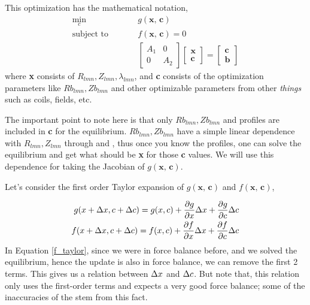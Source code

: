 This optimization has the mathematical notation,
\begin{equation}
    \begin{split}
        \min_{c} \hspace{1cm} &g(\textbf{x, c}) \\
        \text{subject to } \hspace{1cm} &f(\textbf{x, c}) = 0\\
        &\begin{bmatrix}
            A_1 & 0\\ 0 & A_2
        \end{bmatrix}\begin{bmatrix}
            \mathbf{x} \\ \mathbf{c}
        \end{bmatrix} = \begin{bmatrix}
            \mathbf{c} \\ \mathbf{b}
        \end{bmatrix}
    \end{split}
\end{equation}
where \textbf{x} consists of $R_{lmn}, Z_{lmn}, \lambda_{lmn}$, and \textbf{c} consists of the optimization parameters like $Rb_{lmn}, Zb_{lmn}$ and other optimizable parameters from other \textit{things} such as coils, fields, etc.

The important point to note here is that only $Rb_{lmn}, Zb_{lmn}$ and profiles are included in \textbf{c} for the equilibrium. $Rb_{lmn}, Zb_{lmn}$ have a simple linear dependence with $R_{lmn}, Z_{lmn}$ through  and , thus once you know the profiles, one can solve the equilibrium and get what should be \textbf{x} for those \textbf{c} values. We will use this dependence for taking the Jacobian of $g(\textbf{x, c})$.

Let's consider the first order Taylor expansion of $g(\textbf{x, c})$ and $f(\textbf{x, c})$,

\begin{align}
    g(x + \Delta x,c + \Delta c) = g(x, c) + \frac{\partial g}{\partial x} \Delta x + \frac{\partial g}{\partial c} \Delta c \label{g_taylor}\\
    f(x + \Delta x,c + \Delta c) = f(x, c) + \frac{\partial f}{\partial x} \Delta x + \frac{\partial f}{\partial c} \Delta c \label{f_taylor}
\end{align}
In Equation \ref{f_taylor}, since we were in force balance before, and we solved the equilibrium, hence the update is also in force balance, we can remove the first 2 terms. This gives us a relation between $\Delta x$ and $\Delta c$. But note that, this relation only uses the first-order terms and expects a very good force balance; some of the inaccuracies of the  stem from this fact.

